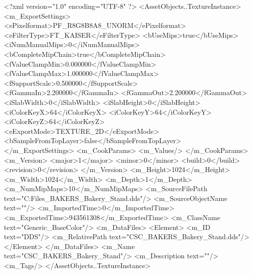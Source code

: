 <?xml version="1.0" encoding="UTF-8" ?>
<AssetObjects..TextureInstance>
	<m_ExportSettings>
		<ePixelformat>PF_R8G8B8A8_UNORM</ePixelformat>
		<eFilterType>FT_KAISER</eFilterType>
		<bUseMips>true</bUseMips>
		<iNumManualMips>0</iNumManualMips>
		<bCompleteMipChain>true</bCompleteMipChain>
		<fValueClampMin>0.000000</fValueClampMin>
		<fValueClampMax>1.000000</fValueClampMax>
		<fSupportScale>0.500000</fSupportScale>
		<fGammaIn>2.200000</fGammaIn>
		<fGammaOut>2.200000</fGammaOut>
		<iSlabWidth>0</iSlabWidth>
		<iSlabHeight>0</iSlabHeight>
		<iColorKeyX>64</iColorKeyX>
		<iColorKeyY>64</iColorKeyY>
		<iColorKeyZ>64</iColorKeyZ>
		<eExportMode>TEXTURE_2D</eExportMode>
		<bSampleFromTopLayer>false</bSampleFromTopLayer>
	</m_ExportSettings>
	<m_CookParams>
		<m_Values/>
	</m_CookParams>
	<m_Version>
		<major>1</major>
		<minor>0</minor>
		<build>0</build>
		<revision>0</revision>
	</m_Version>
	<m_Height>1024</m_Height>
	<m_Width>1024</m_Width>
	<m_Depth>1</m_Depth>
	<m_NumMipMaps>10</m_NumMipMaps>
	<m_SourceFilePath text="C:\Users\Shadow\Desktop\Working Files\Textures\CSC_BAKERS_Bakery_Stand.dds"/>
	<m_SourceObjectName text=""/>
	<m_ImportedTime>0</m_ImportedTime>
	<m_ExportedTime>943561308</m_ExportedTime>
	<m_ClassName text="Generic_BaseColor"/>
	<m_DataFiles>
		<Element>
			<m_ID text="DDS"/>
			<m_RelativePath text="CSC_BAKERS_Bakery_Stand.dds"/>
		</Element>
	</m_DataFiles>
	<m_Name text="CSC_BAKERS_Bakery_Stand"/>
	<m_Description text=""/>
	<m_Tags/>
</AssetObjects..TextureInstance>

